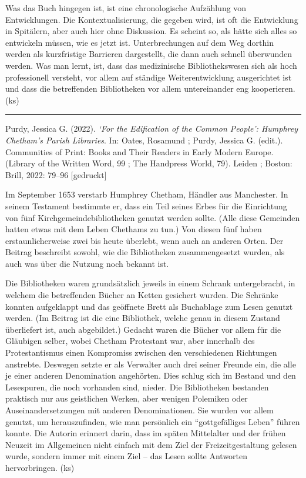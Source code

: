 \documentclass[a4paper,
fontsize=11pt,
oneside,
numbers=noperiodatend,
parskip=half-,
bibliography=totoc,
final
]{scrartcl}
\begin{document}
Was das Buch hingegen ist, ist eine chronologische Aufzählung von
Entwicklungen. Die Kontextualisierung, die gegeben wird, ist oft die
Entwicklung in Spitälern, aber auch hier ohne Diskussion. Es scheint so,
als hätte sich alles so entwickeln müssen, wie es jetzt ist.
Unterbrechungen auf dem Weg dorthin werden als kurzfristige Barrieren
dargestellt, die dann auch schnell überwunden werden. Was man lernt,
ist, dass das medizinische Bibliothekswesen sich als hoch professionell
versteht, vor allem auf ständige Weiterentwicklung ausgerichtet ist und
dass die betreffenden Bibliotheken vor allem untereinander eng
kooperieren. (ks)

\begin{center}\rule{0.5\linewidth}{0.5pt}\end{center}

Purdy, Jessica G. (2022). \emph{\enquote*{For the Edification of the
Common People}: Humphrey Chetham's Parish Libraries}. In: Oates,
Rosamund ; Purdy, Jessica G. (edit.). Communities of Print: Books and
Their Readers in Early Modern Europe. (Library of the Written Word, 99 ;
The Handpress World, 79). Leiden ; Boston: Brill, 2022: 79--96
{[}gedruckt{]}

Im September 1653 verstarb Humphrey Chetham, Händler aus Manchester. In
seinem Testament bestimmte er, dass ein Teil seines Erbes für die
Einrichtung von fünf Kirchgemeindebibliotheken genutzt werden sollte.
(Alle diese Gemeinden hatten etwas mit dem Leben Chethams zu tun.) Von
diesen fünf haben erstaunlicherweise zwei bis heute überlebt, wenn auch
an anderen Orten. Der Beitrag beschreibt sowohl, wie die Bibliotheken
zusammengesetzt wurden, als auch was über die Nutzung noch bekannt ist.

Die Bibliotheken waren grundsätzlich jeweils in einem Schrank
untergebracht, in welchem die betreffenden Bücher an Ketten gesichert
wurden. Die Schränke konnten aufgeklappt und das geöffnete Brett als
Buchablage zum Lesen genutzt werden. (Im Beitrag ist die eine
Bibliothek, welche genau in diesem Zustand überliefert ist, auch
abgebildet.) Gedacht waren die Bücher vor allem für die Gläubigen
selber, wobei Chetham Protestant war, aber innerhalb des Protestantismus
einen Kompromiss zwischen den verschiedenen Richtungen anstrebte.
Deswegen setzte er als Verwalter auch drei seiner Freunde ein, die alle
je einer anderen Denomination angehörten. Dies schlug sich im Bestand
und den Lesespuren, die noch vorhanden sind, nieder. Die Bibliotheken
bestanden praktisch nur aus geistlichen Werken, aber wenigen Polemiken
oder Auseinandersetzungen mit anderen Denominationen. Sie wurden vor
allem genutzt, um herauszufinden, wie man persönlich ein
\enquote{gottgefälliges Leben} führen konnte. Die Autorin erinnert
darin, dass im späten Mittelalter und der frühen Neuzeit im Allgemeinen
nicht einfach mit dem Ziel der Freizeitgestaltung gelesen wurde, sondern
immer mit einem Ziel -- das Lesen sollte Antworten hervorbringen. (ks)
\end{document}
